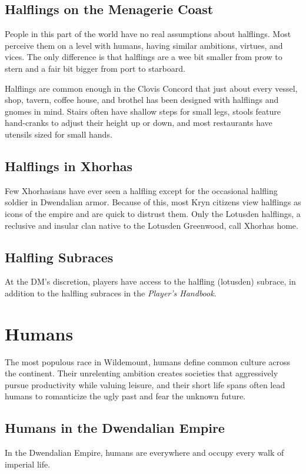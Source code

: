 \documentclass[10pt,a4paper,twoside,bg=print,twocolumn,openany,nodeprecatedcode]{dndbook}
\begin{document}
\subsection{Halflings on the Menagerie Coast}
People in this part of the world have no real assumptions about halflings. Most perceive them on a level with humans, having similar ambitions, virtues, and vices. The only difference is that halflings are a wee bit smaller from prow to stern and a fair bit bigger from port to starboard.

Halflings are common enough in the Clovis Concord that just about every vessel, shop, tavern, coffee house, and brothel has been designed with halflings and gnomes in mind. Stairs often have shallow steps for small legs, stools feature hand-cranks to adjust their height up or down, and most restaurants have utensils sized for small hands.

\subsection{Halflings in Xhorhas}
Few Xhorhasians have ever seen a halfling except for the occasional halfling soldier in Dwendalian armor. Because of this, most Kryn citizens view halflings as icons of the empire and are quick to distrust them. Only the Lotusden halflings, a reclusive and insular clan native to the Lotusden Greenwood, call Xhorhas home.

\subsection{Halfling Subraces}
At the DM's discretion, players have access to the halfling (lotusden) subrace, in addition to the halfling subraces in the \textit{Player's Handbook}.

\section{Humans}
The most populous race in Wildemount, humans define common culture across the continent. Their unrelenting ambition creates societies that aggressively pursue productivity while valuing leisure, and their short life spans often lead humans to romanticize the ugly past and fear the unknown future.

\subsection{Humans in the Dwendalian Empire}
In the Dwendalian Empire, humans are everywhere and occupy every walk of imperial life.
\end{document}
